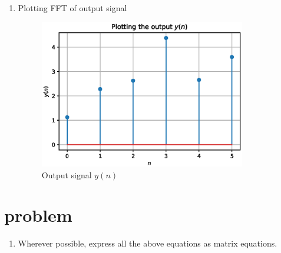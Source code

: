 \documentclass[journal,12pt,twocolumn]{IEEEtran}
\renewcommand\thesection{\arabic{section}}
\begin{document}
\begin{enumerate}[label=\thesection.\arabic*.,ref=\thesection.\theenumi]
\item Plotting  FFT of output signal 
\begin{figure}[h!]
    \centering
    \includegraphics[width=9cm]{./figs/ee18btech11029_2.eps}
    \caption{Output signal $y(n)$}
    \label{YN}
\end{figure}


\end{enumerate}

\section{problem}
\begin{enumerate}[label=\thesection.\arabic*.,ref=\thesection.\theenumi]
    \item Wherever possible, express all the above equations as matrix equations.
\end{enumerate}
\end{document}
